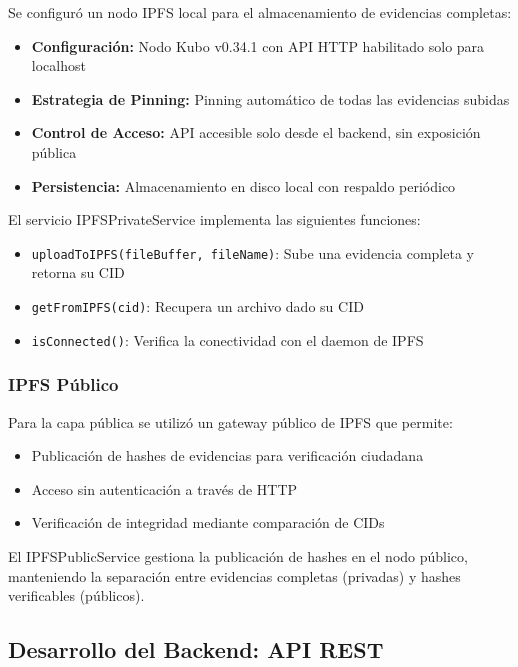 Se configuró un nodo IPFS local para el almacenamiento de evidencias completas:

\begin{itemize}
    \item \textbf{Configuración:} Nodo Kubo v0.34.1 con API HTTP habilitado solo para localhost
    \item \textbf{Estrategia de Pinning:} Pinning automático de todas las evidencias subidas
    \item \textbf{Control de Acceso:} API accesible solo desde el backend, sin exposición pública
    \item \textbf{Persistencia:} Almacenamiento en disco local con respaldo periódico
\end{itemize}

El servicio IPFSPrivateService implementa las siguientes funciones:

\begin{itemize}
    \item \texttt{uploadToIPFS(fileBuffer, fileName)}: Sube una evidencia completa y retorna su CID
    \item \texttt{getFromIPFS(cid)}: Recupera un archivo dado su CID
    \item \texttt{isConnected()}: Verifica la conectividad con el daemon de IPFS
\end{itemize}

\subsubsection{IPFS Público}

Para la capa pública se utilizó un gateway público de IPFS que permite:

\begin{itemize}
    \item Publicación de hashes de evidencias para verificación ciudadana
    \item Acceso sin autenticación a través de HTTP
    \item Verificación de integridad mediante comparación de CIDs
\end{itemize}

El IPFSPublicService gestiona la publicación de hashes en el nodo público, manteniendo la separación entre evidencias completas (privadas) y hashes verificables (públicos).

\subsection{Desarrollo del Backend: API REST}

